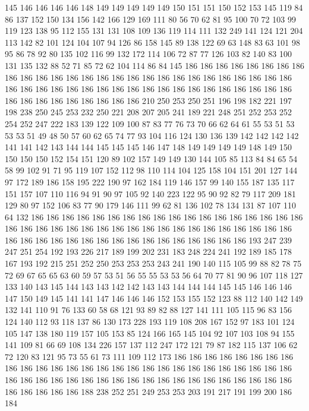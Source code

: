 145 146 146 146 146 148 149 149 149 149 149 150 151 151 150 152 153 145 119 84
86 137 152 150 134 156 142 166 129 169 111 80 56 70 62 81 95 100 70 72
103 99 119 123 138 95 112 155 131 131 108 109 136 119 114 111 132 249 141 124
121 204 113 142 82 101 124 104 107 94 126 86 158 145 89 138 122 69 63 148
83 63 101 98 95 86 78 92 80 135 102 116 99 132 172 114 106 72 87 77
126 103 82 140 83 100 131 135 132 88 52 71 85 72 62 104 114 86 84 145
186 186 186 186 186 186 186 186 186 186 186 186 186 186 186 186 186 186 186 186
186 186 186 186 186 186 186 186 186 186 186 186 186 186 186 186 186 186 186 186
186 186 186 186 186 186 186 186 186 186 186 186 186 186 186 210 250 253 250 251
196 198 182 221 197 198 238 250 245 253 232 250 221 208 207 205 241 189 221 248
251 252 253 252 254 252 247 222 183 139 122 109 100 87 83 77 76 73 70 66
62 64 61 55 53 51 53 53 53 51 49 48 50 57 60 62 65 74 77 93
104 116 124 130 136 139 142 142 142 142 141 141 142 143 144 144 145 145 145 146
147 148 149 149 149 149 148 149 150 150 150 150 152 154 151 120 89 102 157 149
149 130 144 105 85 113 84 84 65 54 58 99 102 91 71 95 119 107 152 112
98 110 114 104 125 158 104 151 201 127 144 97 172 189 186 158 195 222 190 97
162 184 119 146 157 99 140 155 187 135 117 151 157 107 110 116 94 91 90 97
105 92 140 223 122 95 90 92 82 79 117 209 181 129 80 97 152 106 83 77
90 179 146 111 99 62 81 136 102 78 134 131 87 107 110 64 132 186 186 186
186 186 186 186 186 186 186 186 186 186 186 186 186 186 186 186 186 186 186 186
186 186 186 186 186 186 186 186 186 186 186 186 186 186 186 186 186 186 186 186
186 186 186 186 186 186 186 186 186 186 193 247 239 247 251 254 192 193 226 217
189 199 202 231 183 248 224 241 192 189 185 178 167 193 192 215 251 252 250 253
253 253 243 241 190 140 115 105 99 88 82 78 75 72 69 67 65 65 63 60
59 57 53 51 56 55 55 53 53 56 64 70 77 81 90 96 107 118 127 133
140 143 145 144 143 143 142 142 143 143 144 144 144 145 145 146 146 146 147 150
149 145 141 141 147 146 146 146 152 153 155 152 123 88 112 140 142 149 132 141
110 91 76 133 60 58 68 121 93 89 82 88 127 141 111 105 115 96 83 156
124 140 112 93 118 137 86 130 173 228 193 119 108 208 167 152 97 183 101 124
105 147 138 180 119 157 105 153 85 124 166 165 145 104 92 107 103 108 94 155
141 109 81 66 69 108 134 226 157 137 112 247 172 121 79 87 182 115 137 106
62 72 120 83 121 95 73 55 61 73 111 109 112 173 186 186 186 186 186 186
186 186 186 186 186 186 186 186 186 186 186 186 186 186 186 186 186 186 186 186
186 186 186 186 186 186 186 186 186 186 186 186 186 186 186 186 186 186 186 186
186 186 186 186 186 188 238 252 251 249 253 253 203 191 217 191 199 200 186 184
